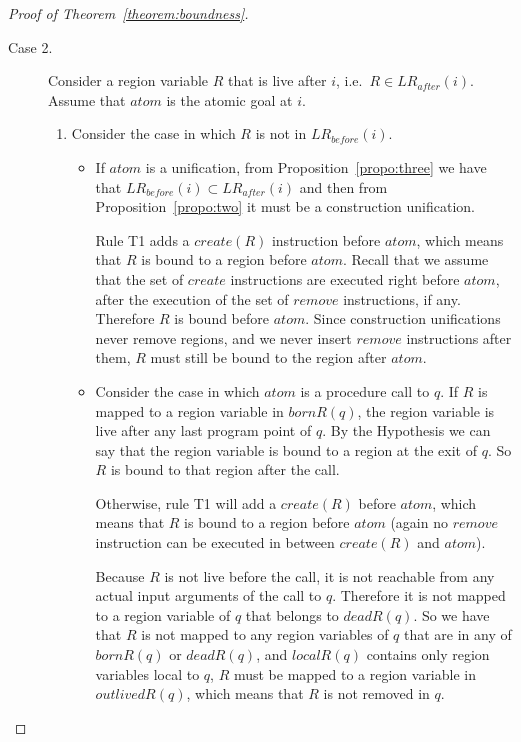 \documentclass{tlp}
\newcommand{\LRb}[1]{\ensuremath{\mathit{LR}_{before}(#1)}}
\newcommand{\LRa}[1]{\ensuremath{\mathit{LR}_{after}(#1)}}
\newcommand{\bornR}[1]{\ensuremath{{bornR}(#1)}}
\newcommand{\deadR}[1]{\ensuremath{{deadR}(#1)}}
\newcommand{\localR}[1]{\ensuremath{{localR}(#1)}}
\newcommand{\outlivedR}[1]{\ensuremath{{outlivedR}(#1)}}
\newcommand{\create}[1]{\ensuremath{{create}(#1)}}
\begin{document}
\begin{proof}[Proof of Theorem~\ref{theorem:boundness}]
\begin{description}
\item[Case 2.]
    Consider a region variable $R$ that is live after $i$,
    i.e.\ $R \in \LRa{i}$.
    Assume that ${atom}$ is the atomic goal at $i$.

    \begin{enumerate}
    \item
        Consider the case in which $R$ is not in \LRb{i}.

        \begin{itemize}
        \item
            If ${atom}$ is a unification,
            from Proposition~\ref{propo:three}
            we have that $\LRb{i} \subset \LRa{i}$
            and then from Proposition~\ref{propo:two}
            it must be a construction unification.

            Rule T1 adds a \create{R} instruction before ${atom}$,
            which means that $R$ is bound to a region before ${atom}$.
            Recall that we assume that
            the set of ${create}$ instructions
            are executed right before ${atom}$,
            after the execution of the set of ${remove}$ instructions, if any.
            Therefore $R$ is bound before ${atom}$.
            Since construction unifications never remove regions,
            and we never insert ${remove}$ instructions after them,
            $R$ must still be bound to the region after ${atom}$.

        \item
            Consider the case in which
            ${atom}$ is a procedure call to $q$.
            If $R$ is mapped to a region variable in \bornR{q},
            the region variable is live
            after any last program point of $q$.
            By the Hypothesis we can say that
            the region variable is bound to a region
            at the exit of $q$.
            So $R$ is bound to that region after the call.

            Otherwise, rule T1 will add a \create{R} before ${atom}$,
            which means that $R$ is bound to a region before ${atom}$
            (again no ${remove}$ instruction can be executed
            in between \create{R} and ${atom}$).

            Because $R$ is not live before the call,
            it is not reachable from any actual input arguments
            of the call to $q$.
            Therefore it is not mapped to a region variable of $q$
            that belongs to \deadR{q}.
            So we have that $R$ is not mapped to any region variables of $q$
            that are in any of \bornR{q} or \deadR{q},
            and \localR{q} contains only region variables local to $q$,
            $R$ must be mapped to a region variable in \outlivedR{q},
            which means that $R$ is not removed in $q$.
        \end{itemize}


\end{enumerate}
\end{description}
\end{proof}
\end{document}

